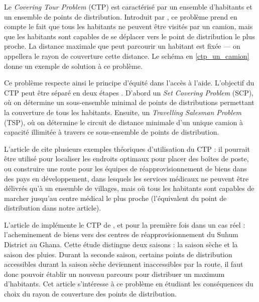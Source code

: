 \documentclass[5p,authoryear,square]{elsarticle}
\begin{document}
Le \emph{Covering Tour Problem} (CTP) est caractérisé par un ensemble d'habitants et un ensemble de points de distribution. Introduit par \cite{gendreau_covering_1997}, ce problème prend en compte le fait que tous les habitants ne peuvent être visités par un camion, mais que les habitants sont capables de se déplacer vers le point de distribution le plus proche. La distance maximale que peut parcourir un habitant est fixée — on appellera le rayon de couverture cette distance. Le schéma en \cref{ctp_un_camion} donne un exemple de solution à ce problème.

Ce problème respecte ainsi le principe d'équité dans l'accès à l'aide. L'objectif du CTP peut être séparé en deux étapes \citep{jozefowiez_bi-objective_2007}. D'abord un \emph{Set Covering Problem} (SCP), où on détermine un sous-ensemble minimal de points de distributions permettant la couverture de tous les habitants. Ensuite, un \emph{Travelling Salesman Problem} (TSP), où on détermine le circuit de distance minimale d'un unique camion à capacité illimitée à travers ce sous-ensemble de points de distribution.

L'article de \cite{gendreau_covering_1997} cite plusieurs exemples théoriques d'utilisation du CTP : il pourrait être utilisé pour localiser les endroits optimaux pour placer des boîtes de poste, ou construire une route pour les équipes de réapprovisionnement de biens dans des pays en développement, dans lesquels les services médicaux ne peuvent être délivrés qu’à un ensemble de villages, mais où tous les habitants sont capables de marcher jusqu'au centre médical le plus proche (l'équivalent du point de distribution dans notre article).

L’article de \cite{hodgson_covering_1998} implémente le CTP de \cite{gendreau_covering_1997}, et pour la première fois dans un cas réel : l’acheminement de biens vers des centres de réapprovisionnement du Suhum District au Ghana. Cette étude distingue deux saisons : la saison sèche et la saison des pluies. Durant la seconde saison, certains points de distribution accessibles durant la saison sèche deviennent inaccessibles par la route, il faut donc pouvoir établir un nouveau parcours pour distribuer un maximum d’habitants. Cet article s’intéresse à ce problème en étudiant les conséquences du choix du rayon de couverture des points de distribution.
\end{document}
